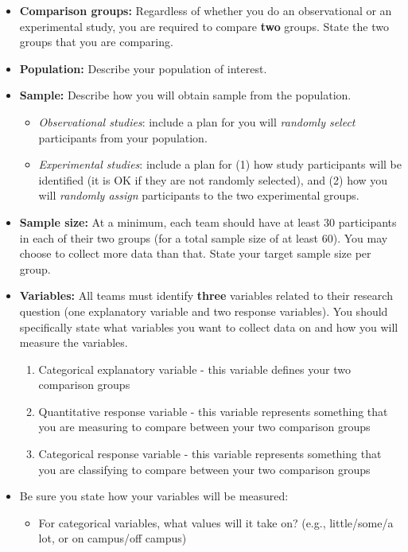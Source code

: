 \documentclass[letterpaper,12pt]{report}
\begin{document}
\begin{itemize}
    \item \textbf{Comparison groups:} Regardless of whether you do an observational or an experimental study, you are required to compare \textbf{two} groups.  State the two groups that you are comparing.
    \item \textbf{Population:} Describe your population of interest.
    \item \textbf{Sample:} Describe how you will obtain sample from the population.
    \begin{itemize}
        \item \emph{Observational studies}: include a plan for you will \emph{randomly select} participants from your population.
        \item \emph{Experimental studies}:  include a plan for (1) how study participants will be identified (it is OK if they are not randomly selected), and (2) how you will \emph{randomly assign} participants to the two experimental groups.
    \end{itemize}
    \item \textbf{Sample size:} At a minimum, each team should have at least 30 participants in each of their two groups (for a total sample size of at least 60).  You may choose to collect more data than that. State your target sample size per group.
    \item \textbf{Variables:}  All teams must identify \textbf{three} variables related to their research question (one explanatory variable and two response variables).  You  should specifically state what variables you want to collect data on and how you will measure the variables.
        \begin{enumerate}
        \item Categorical explanatory variable - this variable defines your two comparison groups
        \item Quantitative response variable - this variable represents something that you are measuring to compare between your two comparison groups
        \item Categorical response variable - this variable represents something that you are classifying to compare between your two comparison groups
        \end{enumerate}
    \item[]
    Be sure you state how your variables will be measured:
    \begin{itemize}
    \item For categorical variables, what values will it take on?  (e.g., little/some/a lot, or on campus/off campus)

\end{itemize}
\end{itemize}
\end{document}
